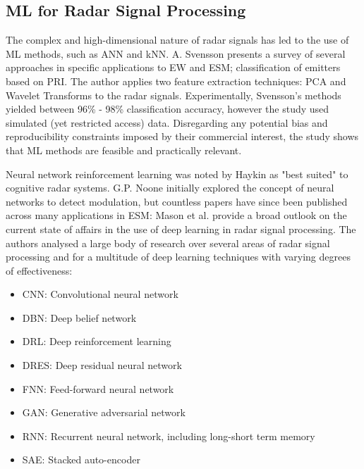 \subsection{ML for Radar Signal Processing}
The complex and high-dimensional nature of radar signals has led to the use of \ac{ML} methods, such as \ac{ANN} and \ac{kNN}. 
A. Svensson \cite{svensson_classification_2022} presents a survey of several approaches in specific applications to \ac{EW} and \ac{ESM}; classification of emitters based on \ac{PRI}.
The author applies two feature extraction techniques: \ac{PCA} and Wavelet Transforms to the radar signals.
Experimentally, Svensson's methods yielded between 96\% - 98\% classification accuracy, however the study used simulated (yet restricted access) data. 
Disregarding any potential bias and reproducibility constraints imposed by their commercial interest, the study shows that \ac{ML} methods are feasible and practically relevant.


Neural network reinforcement learning was noted by Haykin \cite{haykin_cognitive_2006} as "best suited" to cognitive radar systems.
G.P. Noone \cite{noone_neural_1999} initially explored the concept of neural networks to detect modulation, but countless papers have since been published across many applications in \ac{ESM}:
Mason et al. \cite{mason_deep_2017} provide a broad outlook on the current state of affairs in the use of deep learning in radar signal processing.
The authors analysed a large body of research over several areas of radar signal processing and for a multitude of deep learning techniques with varying degrees of effectiveness:
\begin{itemize}
 \item {}CNN: Convolutional neural network
 \item DBN: Deep belief network
 \item DRL: Deep reinforcement learning
 \item DRES: Deep residual neural network
 \item FNN: Feed-forward neural network
 \item GAN: Generative adversarial network
 \item RNN: Recurrent neural network, including long-short term memory
 \item SAE: Stacked auto-encoder
\end{itemize}


